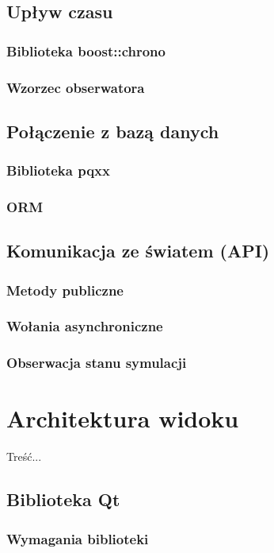 {\subsection{Upływ czasu}
\subsubsection{Biblioteka boost::chrono}
\subsubsection{Wzorzec obserwatora}
\subsection{Połączenie z bazą danych}
\subsubsection{Biblioteka pqxx}
\subsubsection{ORM}
\subsection{Komunikacja ze światem (API)}
\subsubsection{Metody publiczne}
\subsubsection{Wołania asynchroniczne}
\subsubsection{Obserwacja stanu symulacji}

\section[Architektura widoku][Architektura widoku]{Architektura widoku}
\par{ Treść... }
\subsection{Biblioteka Qt}
\subsubsection{Wymagania biblioteki}
}
